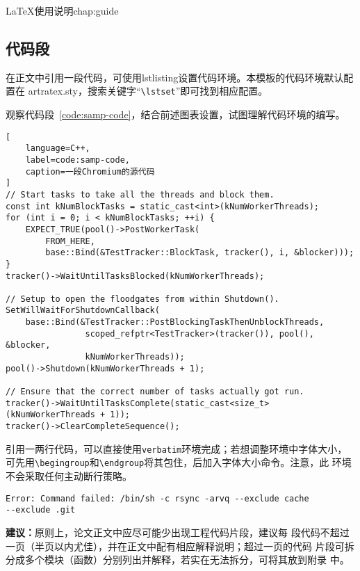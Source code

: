 \begin{cuzchapter}{\LaTeX{}使用说明}{chap:guide}
    \subsection{代码段}\label{sub:listings}

    在正文中引用一段代码，可使用lstlisting设置代码环境。本模板的代码环境默认配置在
    artratex.sty，搜索关键字“\verb|\lstset|”即可找到相应配置。

    观察代码段~\ref{code:samp-code}，结合前述图表设置，试图理解代码环境的编写。

    \begin{lstlisting}[
    language=C++,
    label=code:samp-code,
    caption=一段Chromium的源代码
]
// Start tasks to take all the threads and block them.
const int kNumBlockTasks = static_cast<int>(kNumWorkerThreads);
for (int i = 0; i < kNumBlockTasks; ++i) {
    EXPECT_TRUE(pool()->PostWorkerTask(
        FROM_HERE,
        base::Bind(&TestTracker::BlockTask, tracker(), i, &blocker)));
}
tracker()->WaitUntilTasksBlocked(kNumWorkerThreads);

// Setup to open the floodgates from within Shutdown().
SetWillWaitForShutdownCallback(
    base::Bind(&TestTracker::PostBlockingTaskThenUnblockThreads,
                scoped_refptr<TestTracker>(tracker()), pool(), &blocker,
                kNumWorkerThreads));
pool()->Shutdown(kNumWorkerThreads + 1);

// Ensure that the correct number of tasks actually got run.
tracker()->WaitUntilTasksComplete(static_cast<size_t>(kNumWorkerThreads + 1));
tracker()->ClearCompleteSequence();
\end{lstlisting}

    引用一两行代码，可以直接使用\texttt{verbatim}环境完成；若想调整环境中字体大小，
    可先用\verb|\begingroup|和\verb|\endgroup|将其包住，后加入字体大小命令。注意，此
    环境不会采取任何主动断行策略。

    \begingroup
    \small
    \begin{verbatim}
Error: Command failed: /bin/sh -c rsync -arvq --exclude cache
--exclude .git 
    \end{verbatim}
    \endgroup

    \begin{leftbar}
        \noindent\textbf{建议：}原则上，论文正文中应尽可能少出现工程代码片段，建议每
        段代码不超过一页（半页以内尤佳），并在正文中配有相应解释说明；超过一页的代码
        片段可拆分成多个模块（函数）分别列出并解释，若实在无法拆分，可将其放到附录
        中。
    \end{leftbar}


\end{cuzchapter}
